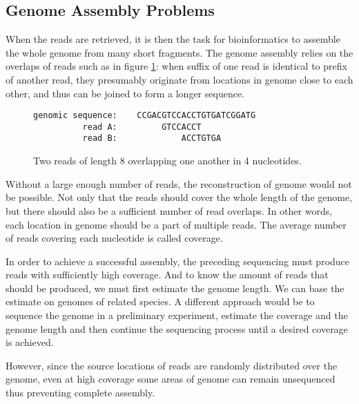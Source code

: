 \subsection{Genome Assembly Problems}

When the reads are retrieved, it is then the task for bioinformatics to assemble the whole genome from many short fragments.
The genome assembly relies on the overlaps of reads such as in figure \ref{fig:overlapping-reads}:
when suffix of one read is identical to prefix of another read, they presumably originate from locations in genome close to each other,
and thus can be joined to form a longer sequence.

\begin{figure}[h]
\centering
\begin{varwidth}{\linewidth}
\begin{verbatim}
genomic sequence:    CCGACGTCCACCTGTGATCGGATG
          read A:         GTCCACCT
          read B:             ACCTGTGA
\end{verbatim}
\end{varwidth}
\caption[Two overlapping reads]{Two reads of length 8 overlapping one another in 4 nucleotides.}
\label{fig:overlapping-reads}
\end{figure}

Without a large enough number of reads, the reconstruction of genome would not be possible.
Not only that the reads should cover the whole length of the genome, but there should also be a sufficient number of read overlaps.
In other words, each location in genome should be a part of multiple reads. The average number of reads covering each nucleotide
is called coverage. %

In order to achieve a successful assembly, the preceding sequencing must produce reads with sufficiently high coverage.
And to know the amount of reads that should be produced, we must first estimate the genome length. We can base the
estimate on genomes of related species. A different approach would be to sequence the genome in a preliminary experiment,
estimate the coverage and the genome length and then continue the sequencing process until a desired coverage is achieved.

However, since the source locations of reads are randomly distributed over the genome, even at high coverage
some areas of genome can remain unsequenced thus preventing complete assembly.

